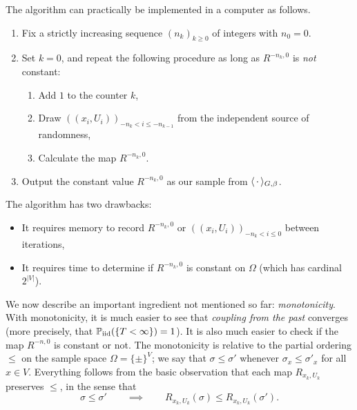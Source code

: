 \begin{remark}
    The algorithm can practically be implemented in a computer as follows.
\begin{enumerate}
    \item Fix a strictly increasing sequence $(n_k)_{k\geq 0}$ of integers with $n_0=0$.
    \item Set $k=0$, and repeat the following procedure as long as $R^{-n_k,0}$ is \emph{not} constant:
    \begin{enumerate}
        \item Add $1$ to the counter $k$,
        \item Draw $((x_i,U_i))_{-n_k< i\leq -n_{k-1}}$ from the independent source of randomness,
        \item Calculate the map $R^{-n_k,0}$.
    \end{enumerate}
    \item Output the constant value $R^{-n_k,0}$ as our sample from $\langle\,\cdot\,\rangle_{G,\beta}$.
\end{enumerate}
\end{remark}

The algorithm has two drawbacks:
\begin{itemize}
    \item It requires memory to record $R^{-n_k,0}$ or $((x_i,U_i))_{-n_k< i\leq 0}$ between iterations,
    \item It requires time to determine if $R^{-n_k,0}$ is constant on $\Omega$ (which has cardinal $2^{|V|}$).
\end{itemize}

We now describe an important ingredient not mentioned so far: \emph{monotonicity}.
With monotonicity, it is much easier to see that \emph{coupling from the past}
converges (more precisely, that $\mathbb P_{\operatorname{iid}}(\{T<\infty\})=1$).
It is also much easier to check if the map $R^{-n,0}$ is constant or not.
The monotonicity is relative to the partial ordering $\leq$
on the sample space $\Omega=\{\pm\}^V$;
we say that $\sigma\leq\sigma'$ whenever $\sigma_x\leq\sigma'_x$ for all $x\in V$.
Everything follows from the basic observation that each map $R_{x_k,U_k}$ preserves
$\leq$, in the sense that
\[
    \sigma\leq\sigma' \qquad \implies \qquad R_{x_k,U_k}(\sigma)\leq R_{x_k,U_k}(\sigma').
\]

